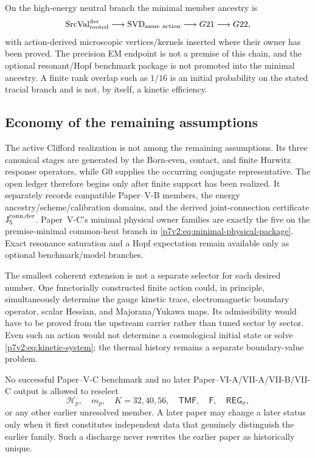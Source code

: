 \documentclass[12pt,a4paper]{article}
\newcommand{\Rconn}{\mathsf J_5^{\rm conn,der}}
\newcommand{\REGsig}{\mathsf{REG}_{\sigma}}
\begin{document}
\begin{corollary}
\label{p7:cor:v236-baryogenesis-ancestry}
On the high-energy neutral branch the minimal member ancestry is
\[
 \mathrm{SrcVal}_{\rm rooted}^{\rm der}\longrightarrow\mathrm{SVD}_{\rm same\ action}\longrightarrow G21\longrightarrow G22,
\]
with action-derived microscopic vertices/kernels inserted where their owner
has been proved.  The precision EM endpoint is not a premise of this chain,
and the optional resonant/Hopf benchmark package is not promoted into the
minimal ancestry.  A finite rank overlap such as \(1/16\) is an initial
probability on the stated tracial branch and is not, by itself, a kinetic
efficiency.
\end{corollary}


\subsection{Economy of the remaining assumptions}
\label{p7v2:sec:economy}

The active Clifford realization is not among the remaining assumptions.  Its
three canonical stages are generated by the Born-even, contact, and finite
Hurwitz response operators, while G0 supplies the occurring conjugate
representative.  The open ledger therefore begins only after finite support has been
realized.  It separately records compatible
Paper--V-B members, the energy ancestry/scheme/calibration domains, and the
derived joint-connection certificate \(\Rconn\).  Paper~V-C's minimal physical
owner families are exactly the five on the premise-minimal common-heat branch in
\eqref{p7v2:eq:minimal-physical-package}.  Exact resonance saturation and a
Hopf expectation remain available only as optional benchmark/model branches.

The smallest coherent extension is not a separate selector for each desired
number.  One functorially constructed finite action could, in principle,
simultaneously determine the gauge kinetic trace, electromagnetic boundary
operator, scalar Hessian, and Majorana/Yukawa maps.  Its admissibility would
have to be proved from the upstream carrier rather than tuned sector by sector.
Even such an action would not determine a cosmological initial state or solve
\eqref{p7v2:eq:kinetic-system}; the thermal history remains a separate
boundary-value problem.

\begin{remark}
No successful Paper--V-C benchmark and no later Paper--VI-A/VII-A/VII-B/VII-C output is
allowed to reselect
\[
 \mathcal H_p,\quad m_p,\quad K=32,40,56,\quad
 \mathsf{TMF},\quad\mathsf F,\quad\REGsig,
\]
or any other earlier unresolved member.  A later paper may change a later
status only when it first constitutes independent data that genuinely
distinguish the earlier family.  Such a discharge never rewrites the earlier
paper as historically unique.
\end{remark}
\end{document}
